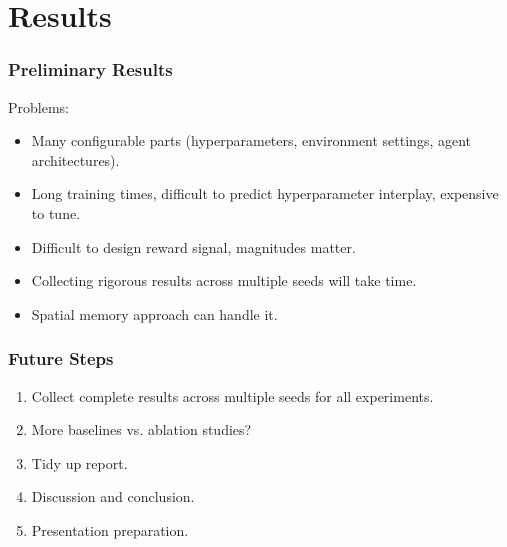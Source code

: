 \section{Results}

\begin{frame}
    \frametitle{Preliminary Results}

    Problems:

    \begin{itemize}
        \item Many configurable parts (hyperparameters, environment settings, agent architectures).
        \item Long training times, difficult to predict hyperparameter interplay, expensive to tune.
        \item Difficult to design reward signal, magnitudes matter.
        \item Collecting rigorous results across multiple seeds will take time.
        \item Spatial memory approach can handle it.
    \end{itemize}
\end{frame}

\begin{frame}
    \frametitle{Future Steps}

    \begin{enumerate}
        \item Collect complete results across multiple seeds for all experiments.
        \item More baselines vs. ablation studies?
        \item Tidy up report.
        \item Discussion and conclusion.
        \item Presentation preparation.
    \end{enumerate}
\end{frame}
